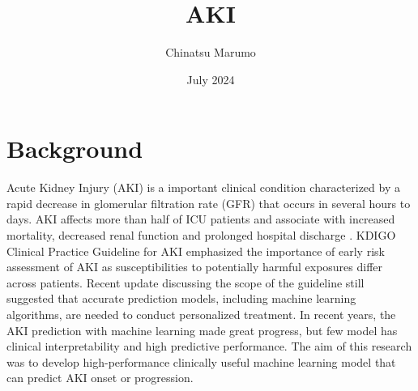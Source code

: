 \documentclass{article}
\title{AKI}
\author{Chinatsu Marumo}
\date{July 2024}
\begin{document}
\maketitle

\section{Background}
Acute Kidney Injury (AKI) is a important clinical condition characterized by a rapid decrease in glomerular filtration rate (GFR) that occurs in several hours to days. AKI affects more than half of ICU patients and associate with increased mortality, decreased renal function and prolonged hospital discharge \cite{1}. 
KDIGO Clinical Practice Guideline for AKI emphasized the importance of early risk assessment of AKI as susceptibilities to potentially harmful exposures differ across patients. Recent update discussing the scope of the guideline still suggested that accurate prediction models, including machine learning algorithms, are needed to conduct personalized treatment. \cite{2}
In recent years, the AKI prediction with machine learning made great progress, but few model has clinical interpretability and high predictive performance. \cite{3} The aim of this research was to develop high-performance clinically useful machine learning model that can predict AKI onset or progression.



\end{document}
